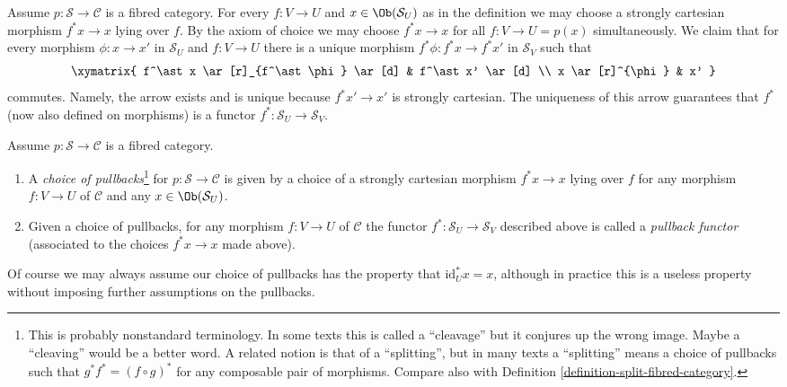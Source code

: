\noindent
Assume $p : \mathcal{S} \to \mathcal{C}$ is a fibred category.
For every $f : V \to U$ and $x\in \Ob(\mathcal{S}_U)$
as in the definition we may choose a strongly cartesian morphism
$f^\ast x \to x$ lying over $f$. By the axiom of choice we may choose
$f^*x \to x$ for all $f: V \to U = p(x)$ simultaneously.
We claim that for every morphism $\phi : x \to x'$ in $\mathcal{S}_U$
and $f : V \to U$ there is a unique
morphism $f^\ast \phi : f^\ast x \to f^\ast x'$ in $\mathcal{S}_V$
such that
$$
\xymatrix{
f^\ast x \ar[r]_{f^\ast \phi} \ar[d] & f^\ast x' \ar[d] \\
x \ar[r]^{\phi} & x' }
$$
commutes. Namely, the arrow exists and is unique because $f^*x' \to x'$ is
strongly cartesian. The uniqueness of this arrow guarantees that
$f^\ast$ (now also defined on morphisms) is a
functor $ f^\ast : \mathcal{S}_U \to \mathcal{S}_V$.

\begin{definition}
\label{definition-pullback-functor-fibred-category}
Assume $p : \mathcal{S} \to \mathcal{C}$ is a fibred category.
\begin{enumerate}
\item A {\it choice of pullbacks}\footnote{This is probably nonstandard
terminology. In some texts this is called a ``cleavage'' but it conjures up
the wrong image. Maybe a ``cleaving'' would be a better word.
A related notion is that of a ``splitting'', but in many texts a ``splitting''
means a choice of pullbacks such that $g^*f^* = (f \circ g)^*$
for any composable pair of morphisms. Compare
also with Definition \ref{definition-split-fibred-category}.}
for $p : \mathcal{S} \to \mathcal{C}$
is given by a choice of a strongly cartesian morphism
$f^\ast x \to x$ lying over $f$ for any morphism
$f: V \to U$ of $\mathcal{C}$ and any $x \in \Ob(\mathcal{S}_U)$.
\item Given a choice of pullbacks,
for any morphism $f : V \to U$ of $\mathcal{C}$
the functor $f^* : \mathcal{S}_U \to \mathcal{S}_V$ described
above is called a {\it pullback functor} (associated to the choices
$f^*x \to x$ made above).
\end{enumerate}
\end{definition}

\noindent
Of course we may always assume our choice of pullbacks has the property that
$\text{id}_U^*x = x$, although in practice this is a useless property
without imposing further assumptions on the pullbacks.

